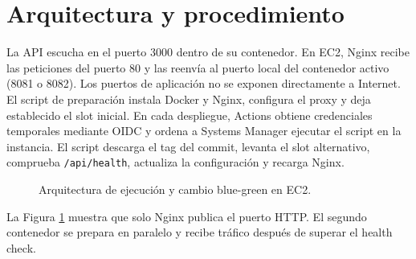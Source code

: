 \documentclass[12pt,letterpaper]{article}
\begin{document}
\section{Arquitectura y procedimiento}
La API escucha en el puerto 3000 dentro de su contenedor. En EC2, Nginx recibe las peticiones del puerto 80 y las reenvía al puerto local del contenedor activo (8081 o 8082). Los puertos de aplicación no se exponen directamente a Internet. El script de preparación instala Docker y Nginx, configura el proxy y deja establecido el slot inicial. En cada despliegue, Actions obtiene credenciales temporales mediante OIDC y ordena a Systems Manager ejecutar el script en la instancia. El script descarga el tag del commit, levanta el slot alternativo, comprueba \texttt{/api/health}, actualiza la configuración y recarga Nginx.

\begin{figure}[H]
\centering
{}
\caption{Arquitectura de ejecución y cambio blue-green en EC2.}
\label{fig:arquitectura}
\end{figure}
La Figura \ref{fig:arquitectura} muestra que solo Nginx publica el puerto HTTP. El segundo contenedor se prepara en paralelo y recibe tráfico después de superar el health check.
\end{document}
